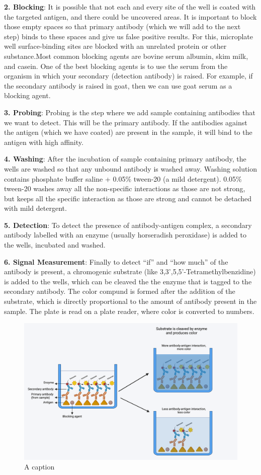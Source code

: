 \documentclass[
]{book}
\begin{document}
\textbf{2. Blocking}: It is possible that not each and every site of the well is coated with the targeted antigen, and there could be uncovered areas. It is important to block those empty spaces so that primary antibody (which we will add to the next step) binds to these spaces and give us false positive results. For this, microplate well surface-binding sites are blocked with an unrelated protein or other substance.Most common blocking agents are bovine serum albumin, skim milk, and casein. One of the best blocking agents is to use the serum from the organism in which your secondary (detection antibody) is raised. For example, if the secondary antibody is raised in goat, then we can use goat serum as a blocking agent.

\textbf{3. Probing}: Probing is the step where we add sample containing antibodies that we want to detect. This will be the primary antibody. If the antibodies against the antigen (which we have coated) are present in the sample, it will bind to the antigen with high affinity.

\textbf{4. Washing}: After the incubation of sample containing primary antibody, the wells are washed so that any unbound antibody is washed away. Washing solution contains phosphate buffer saline + 0.05\% tween-20 (a mild detergent). 0.05\% tween-20 washes away all the non-specific interactions as those are not strong, but keeps all the specific interaction as those are strong and cannot be detached with mild detergent.

\textbf{5. Detection}: To detect the presence of antibody-antigen complex, a secondary antibody labelled with an enzyme (usually horseradish peroxidase) is added to the wells, incubated and washed.

\textbf{6. Signal Measurement}: Finally to detect ``if'' and ``how much'' of the antibody is present, a chromogenic substrate (like 3,3',5,5'-Tetramethylbenzidine) is added to the wells, which can be cleaved the the enzyme that is tagged to the secondary antibody. The color compund is formed after the addition of the substrate, which is directly proportional to the amount of antibody present in the sample. The plate is read on a plate reader, where color is converted to numbers.

\begin{figure}
\includegraphics[width=1\linewidth]{DATA/elisa} \caption{A caption}\label{fig:pressure}
\end{figure}
\end{document}
